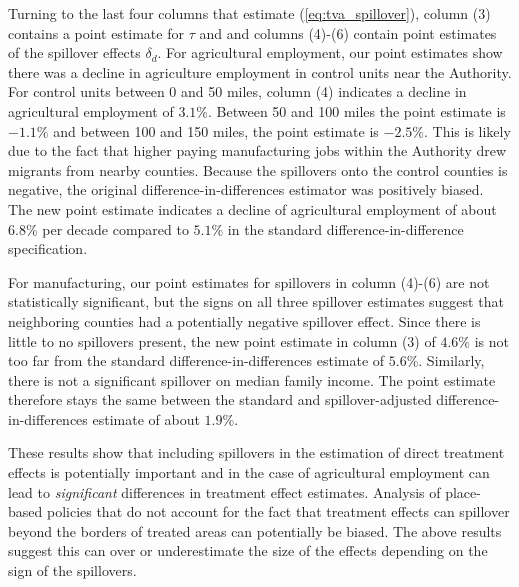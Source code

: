 \documentclass[11pt]{article}
\begin{document}
Turning to the last four columns that estimate (\ref{eq:tva_spillover}), column (3) contains a point estimate for $\tau$ and and columns (4)-(6) contain point estimates of the spillover effects $\delta_d$. For agricultural employment, our point estimates show there was a decline in agriculture employment in control units near the Authority. For control units between 0 and 50 miles, column (4) indicates a decline in agricultural employment of $3.1\%$. Between 50 and 100 miles the point estimate is $-1.1\%$ and between 100 and 150 miles, the point estimate is $-2.5\%$. This is likely due to the fact that higher paying manufacturing jobs within the Authority drew migrants from nearby counties. Because the spillovers onto the control counties is negative, the original difference-in-differences estimator was positively biased. The new point estimate indicates a decline of agricultural employment of about $6.8\%$ per decade compared to $5.1\%$ in the standard difference-in-difference specification. 

For manufacturing, our point estimates for spillovers in column (4)-(6) are not statistically significant, but the signs on all three spillover estimates suggest that neighboring counties had a potentially negative spillover effect. Since there is little to no spillovers present, the new point estimate in column (3) of $4.6\%$ is not too far from the standard difference-in-differences estimate of $5.6\%$. Similarly, there is not a significant spillover on median family income. The point estimate therefore stays the same between the standard and spillover-adjusted difference-in-differences estimate of about $1.9\%$. 

These results show that including spillovers in the estimation of direct treatment effects is potentially important and in the case of agricultural employment can lead to \emph{significant} differences in treatment effect estimates. Analysis of place-based policies that do not account for the fact that treatment effects can spillover beyond the borders of treated areas can potentially be biased. The above results suggest this can over or underestimate the size of the effects depending on the sign of the spillovers. 






\newpage \printbibliography%


\newpage \appendix 
\renewcommand{\thetable}{\Alph{section}.\arabic{table}}
\renewcommand{\thefigure}{\Alph{section}.\arabic{figure}}
\end{document}
